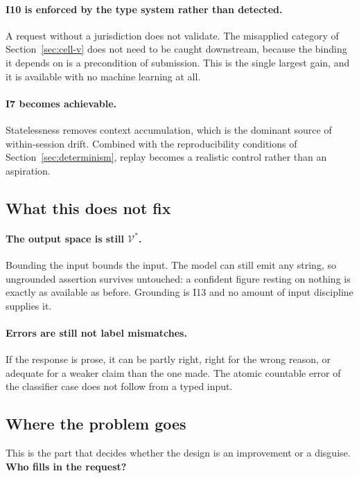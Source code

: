 \paragraph{I10 is enforced by the type system rather than detected.} A request without
a jurisdiction does not validate. The misapplied category of
Section~\ref{sec:cell-v} does not need to be caught downstream, because the binding
it depends on is a precondition of submission. This is the single largest gain, and
it is available with no machine learning at all.

\paragraph{I7 becomes achievable.} Statelessness removes context accumulation, which
is the dominant source of within-session drift. Combined with the reproducibility
conditions of Section~\ref{sec:determinism}, replay becomes a realistic control
rather than an aspiration.

\subsection{What this does not fix}

\paragraph{The output space is still $\mathcal{V}^{*}$.} Bounding the input bounds the
input. The model can still emit any string, so ungrounded assertion survives
untouched: a confident figure resting on nothing is exactly as available as before.
Grounding is I13 and no amount of input discipline supplies it.

\paragraph{Errors are still not label mismatches.} If the response is prose, it can be
partly right, right for the wrong reason, or adequate for a weaker claim than the one
made. The atomic countable error of the classifier case does not follow from a typed
input.

\subsection{Where the problem goes}
\label{sec:relocation}

This is the part that decides whether the design is an improvement or a disguise.
\textbf{Who fills in the request?}

